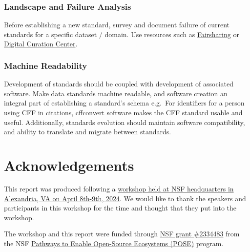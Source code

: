 \documentclass[
  letterpaper,
  DIV=11,
  numbers=noendperiod]{scrartcl}
\begin{document}
\subsubsection{Landscape and Failure
Analysis}\label{landscape-and-failure-analysis}

Before establishing a new standard, survey and document failure of
current standards for a specific dataset / domain. Use resources such as
\href{https://fairsharing.org/}{Fairsharing} or
\href{https://www.dcc.ac.uk/guidance/standards}{Digital Curation
Center}.

\subsubsection{Machine Readability}\label{machine-readability}

Development of standards should be coupled with development of
associated software. Make data standards machine readable, and software
creation an integral part of establishing a standard's schema e.g.~For
identifiers for a person using CFF in citations, cffconvert software
makes the CFF standard usable and useful. Additionally, standards
evolution should maintain software compatibility, and ability to
translate and migrate between standards.

\section{Acknowledgements}\label{acknowledgements}

This report was produced following a
\href{https://uwescience.github.io/2024-open-source-standards-workshop/}{workshop
held at NSF headquarters in Alexandria, VA on April 8th-9th, 2024}. We
would like to thank the speakers and participants in this workshop for
the time and thought that they put into the workshop.

The workshop and this report were funded through
\href{https://www.nsf.gov/awardsearch/showAward?AWD_ID=2334483&HistoricalAwards=false}{NSF
grant \#2334483} from the NSF
\href{https://new.nsf.gov/funding/opportunities/pathways-enable-open-source-ecosystems-pose}{Pathways
to Enable Open-Source Ecosystems (POSE)} program.
\end{document}
